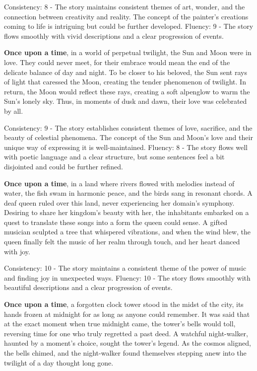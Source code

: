 \documentclass{article}
\begin{document}
Consistency: 8 - The story maintains consistent themes of art, wonder, and the connection between creativity and reality. The concept of the painter's creations coming to life is intriguing but could be further developed.
Fluency: 9 - The story flows smoothly with vivid descriptions and a clear progression of events.

\textbf{Once upon a time}, in a world of perpetual twilight, the Sun and Moon were in love. They could never meet, for their embrace would mean the end of the delicate balance of day and night. To be closer to his beloved, the Sun sent rays of light that caressed the Moon, creating the tender phenomenon of twilight. In return, the Moon would reflect these rays, creating a soft alpenglow to warm the Sun's lonely sky. Thus, in moments of dusk and dawn, their love was celebrated by all.

Consistency: 9 - The story establishes consistent themes of love, sacrifice, and the beauty of celestial phenomena. The concept of the Sun and Moon's love and their unique way of expressing it is well-maintained.
Fluency: 8 - The story flows well with poetic language and a clear structure, but some sentences feel a bit disjointed and could be further refined.

\textbf{Once upon a time}, in a land where rivers flowed with melodies instead of water, the fish swam in harmonic peace, and the birds sang in resonant chords. A deaf queen ruled over this land, never experiencing her domain’s symphony. Desiring to share her kingdom's beauty with her, the inhabitants embarked on a quest to translate these songs into a form the queen could sense. A gifted musician sculpted a tree that whispered vibrations, and when the wind blew, the queen finally felt the music of her realm through touch, and her heart danced with joy.

Consistency: 10 - The story maintains a consistent theme of the power of music and finding joy in unexpected ways.
Fluency: 10 - The story flows smoothly with beautiful descriptions and a clear progression of events.

\textbf{Once upon a time}, a forgotten clock tower stood in the midst of the city, its hands frozen at midnight for as long as anyone could remember. It was said that at the exact moment when true midnight came, the tower's bells would toll, reversing time for one who truly regretted a past deed. A watchful night-walker, haunted by a moment's choice, sought the tower's legend. As the cosmos aligned, the bells chimed, and the night-walker found themselves stepping anew into the twilight of a day thought long gone.
\end{document}
